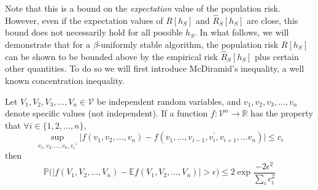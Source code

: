 \documentclass{article}
\begin{document}







Note that this is a bound on the  \textit{expectation} value of the population risk. However, even if the expectation values of $R[h_S]$ and $\hat{R}_S[h_S]$ are close, this bound does not necessarily hold for all possible $h_S$. 
In what follows, we will demonstrate that for a $\beta$-uniformly stable algorithm, the population risk  $R[h_S]$ can be shown to be bounded above by the empirical risk $\hat{R}_S[h_S]$ plus certain other quantities. To do so we will first introduce McDiramid's inequality, a well known concentration inequality.

\begin{thm}
Let $V_1, V_2, V_3, \dots , V_n \in \mathcal{V}$ be independent random variables, and $v_1, v_2,v_3,\dots,v_n$ denote specific values (not independent). If a function $f: \mathcal{V}^n \to \mathbb{R}$ has the property that $\forall i \in \{1, 2, \dots, n\}$, 
\[
	\sup_{v_1, v_2, \dots, v_n, v_i{'}}{\biggl|f(v_1, v_2, \dots, v_n) - f(v_1, \dots,v_{i-1}, v_i^{'}, v_{i+1}, \dots v_n)\biggr|} \leq c_i
\]
then
\[
    \mathbb{P}\biggl(\bigl|f(V_1, V_2, \dots , V_n) - \mathbb{E}f(V_1, V_2, \dots , V_n)\bigr|>\epsilon\biggr) \leq 2 \exp{\frac{-2 \epsilon^2}{\sum_{i}{c_{i}^2}}}
\]
\end{thm}
\end{document}
